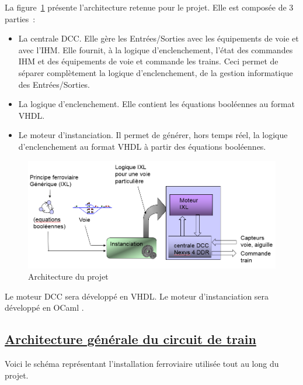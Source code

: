 La figure~\ref{archi} présente l'architecture retenue pour le
projet. Elle est composée de 3 parties~:
  \begin{itemize}
    \item La centrale DCC. Elle gère les Entrées/Sorties avec les
      équipements de voie et avec l'IHM. Elle fournit, à la logique
      d'enclenchement, l'état des commandes IHM et des équipements de
      voie et commande les trains. Ceci permet de séparer complètement
      la logique d'enclenchement, de la gestion informatique des
      Entrées/Sorties.
    \item La logique d'enclenchement. Elle contient les équations
      booléennes au format VHDL. 
    \item Le moteur d'instanciation. Il permet de générer, hors temps réel,
      la logique d'enclenchement au format VHDL à partir des équations
      booléennes.
  \end{itemize}

\begin{figure}[h]
\centering
\includegraphics[scale=0.30]{moteur.png}
\caption{Architecture du projet}
\label{archi}
\end{figure}

Le moteur DCC sera développé en VHDL. Le moteur d'instanciation sera
développé en OCaml \cite{OCAML}.


\newpage
\subsection{\underline{Architecture g\'en\'erale du circuit de train}}
\label{sec:archi}

Voici le sch\'ema repr\'esentant l'installation ferroviaire utilis\'ee
tout au long du projet. 

